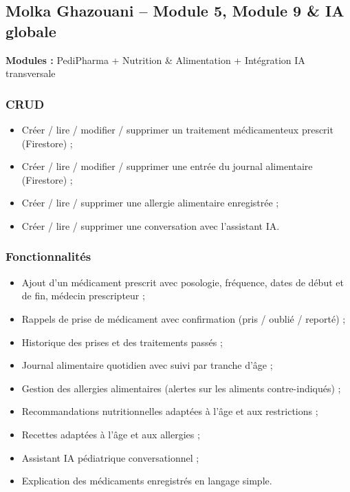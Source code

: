 \documentclass[11pt,a4paper]{article}
\begin{document}
\vspace{0.5cm}
\subsection{Molka Ghazouani -- Module 5, Module 9 \& IA globale}

\textbf{Modules :} PediPharma + Nutrition \& Alimentation + Intégration IA transversale

\subsubsection*{CRUD}
\begin{itemize}
  \item Créer / lire / modifier / supprimer un traitement médicamenteux prescrit (Firestore) ;
  \item Créer / lire / modifier / supprimer une entrée du journal alimentaire (Firestore) ;
  \item Créer / lire / supprimer une allergie alimentaire enregistrée ;
  \item Créer / lire / supprimer une conversation avec l'assistant IA.
\end{itemize}

\subsubsection*{Fonctionnalités}
\begin{itemize}
  \item Ajout d'un médicament prescrit avec posologie, fréquence, dates de début et de fin, médecin prescripteur ;
  \item Rappels de prise de médicament avec confirmation (pris / oublié / reporté) ;
  \item Historique des prises et des traitements passés ;
  \item Journal alimentaire quotidien avec suivi par tranche d'âge ;
  \item Gestion des allergies alimentaires (alertes sur les aliments contre-indiqués) ;
  \item Recommandations nutritionnelles adaptées à l'âge et aux restrictions ;
  \item Recettes adaptées à l'âge et aux allergies ;
  \item Assistant IA pédiatrique conversationnel ;
  \item Explication des médicaments enregistrés en langage simple.
\end{itemize}
\end{document}
